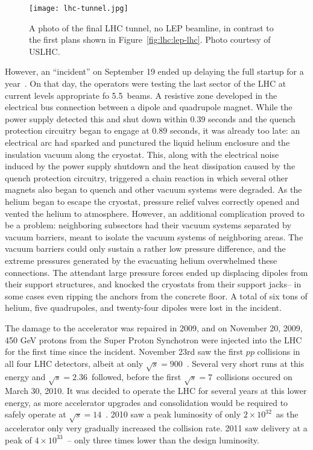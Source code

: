 
\begin{figure}
\centering
\texttt{[image: lhc-tunnel.jpg]}
\label{fig:lhc:lhc-tunnel}
\caption{A photo of the final LHC tunnel, no LEP beamline, in contrast to the first plans shown in Figure~\ref{fig:lhc:lep-lhc}. Photo courtesy of USLHC.}
\end{figure}


However, an ``incident'' on September 19 ended up delaying the full startup for a year~\cite{Incident}. On that day, the operators were testing the last sector of the LHC at current levels appropriate fo 5.5~\TeV beams. A resistive zone developed in the electrical bus connection between a dipole and quadrupole magnet. While the power supply detected this and shut down within 0.39 seconds and the quench protection circuitry began to engage at 0.89 seconds, it was already too late: an electrical arc had sparked and punctured the liquid helium enclosure and the insulation vacuum along the cryostat. This, along with the electrical noise induced by the power supply shutdown and the heat dissipation caused by the quench protection circuitry, triggered a chain reaction in which several other magnets also began to quench and other vacuum systems were degraded. As the helium began to escape the cryostat, pressure relief valves correctly opened and vented the helium to atmosphere. However, an additional complication proved to be a problem: neighboring subsectors had their vacuum systems separated by vacuum barriers, meant to isolate the vacuum systems of neighboring areas. The vacuum barriers could only sustain a rather low pressure difference, and the extreme pressures generated by the evacuating helium overwhelmed these connections. The attendant large pressure forces ended up displacing dipoles from their support structures, and knocked the cryostats from their support jacks-- in some cases even ripping the anchors from the concrete floor. A total of six tons of helium, five quadrupoles, and twenty-four dipoles were lost in the incident. 

The damage to the accelerator was repaired in 2009, and on November 20, 2009, 450 GeV protons from the Super Proton Synchotron were injected into the LHC for the first time since the incident. November 23rd saw the first $pp$ collisions in all four LHC detectors, albeit at only $\sqrt{s} = 900$~\GeV. Several very short runs at this energy and $\sqrt{s} = 2.36$~\TeV followed, before the first $\sqrt{s} = 7$~\TeV collisions occured on March 30, 2010. It was decided to operate the LHC for several years at this lower energy, as more accelerator upgrades and consolidation would be required to safely operate at $\sqrt{s} = 14$~\TeV. 2010 saw a peak luminosity of only $2\times10^{32}$~\lumirate as the accelerator only very gradually increased the collision rate. 2011 saw delivery at a peak of $4 \times 10^{33}$~\lumirate-- only three times lower than the design luminosity.

